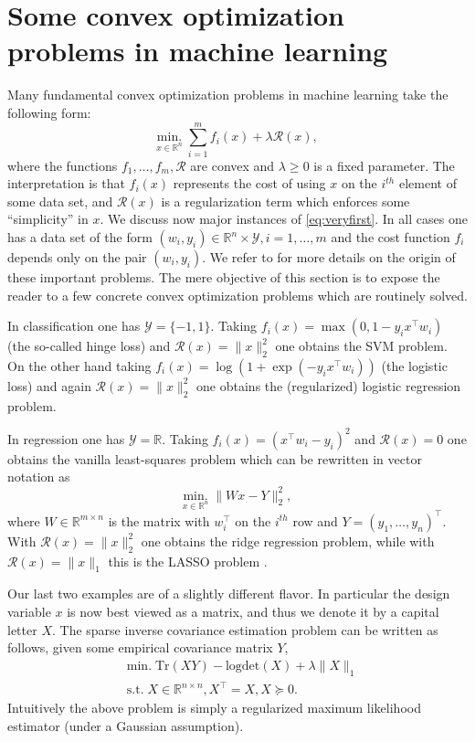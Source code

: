 \documentclass[openany]{now}
\newcommand{\R}{\mathbb{R}}
\newcommand{\cR}{\mathcal{R}}
\newcommand{\cY}{\mathcal{Y}}
\begin{document}
\section{Some convex optimization problems in machine learning} \label{sec:mlapps}
Many fundamental convex optimization problems in machine learning take the following form:
\begin{equation} \label{eq:veryfirst}
\underset{x \in \R^n}{\mathrm{min.}} \; \sum_{i=1}^m f_i(x) + \lambda \cR(x) ,
\end{equation}
where the functions $f_1, \hdots, f_m, \cR$ are convex and $\lambda \geq 0$ is a fixed parameter. The interpretation is that $f_i(x)$ represents the cost of using $x$ on the $i^{th}$ element of some data set, and $\cR(x)$ is a regularization term which enforces some ``simplicity'' in $x$. We discuss now major instances of \eqref{eq:veryfirst}. In all cases one has a data set of the form $(w_i, y_i) \in \R^n \times \cY, i=1, \hdots, m$ and the cost function $f_i$ depends only on the pair $(w_i, y_i)$. We refer to \cite{HTF01, SS02, SSS14} for more details on the origin of these important problems. The mere objective of this section is to expose the reader to a few concrete convex optimization problems which are routinely solved.
 
In classification one has $\cY = \{-1,1\}$. Taking $f_i(x) = \max(0, 1- y_i x^{\top} w_i)$ (the so-called hinge loss) and $\cR(x) = \|x\|_2^2$ one obtains the SVM problem. On the other hand taking $f_i(x) = \log(1 + \exp(-y_i x^{\top} w_i) )$ (the logistic loss) and again $\cR(x) = \|x\|_2^2$ one obtains the (regularized) logistic regression problem.

In regression one has $\cY = \R$. Taking $f_i(x) = (x^{\top} w_i - y_i)^2$ and $\cR(x) = 0$ one obtains the vanilla least-squares problem which can be rewritten in vector notation as
$$\underset{x \in \R^n}{\mathrm{min.}} \; \|W x - Y\|_2^2 ,$$
where $W \in \R^{m \times n}$ is the matrix with $w_i^{\top}$ on the $i^{th}$ row and $Y =(y_1, \hdots, y_n)^{\top}$.
With $\cR(x) = \|x\|_2^2$ one obtains the ridge regression problem, while with $\cR(x) = \|x\|_1$ this is the LASSO problem \cite{Tib96}.

Our last two examples are of a slightly different flavor. In particular the design variable $x$ is now best viewed as a matrix, and thus we denote it by a capital letter $X$. The sparse inverse covariance estimation problem can be written as follows, given some empirical covariance matrix $Y$,
\begin{align*}
& \mathrm{min.} \; \mathrm{Tr}(X Y) - \mathrm{logdet}(X) + \lambda \|X\|_1 \\
& \text{s.t.} \; X \in \R^{n \times n}, X^{\top} = X, X \succeq 0 .
\end{align*}
Intuitively the above problem is simply a regularized maximum likelihood estimator (under a Gaussian assumption). 
\end{document}

